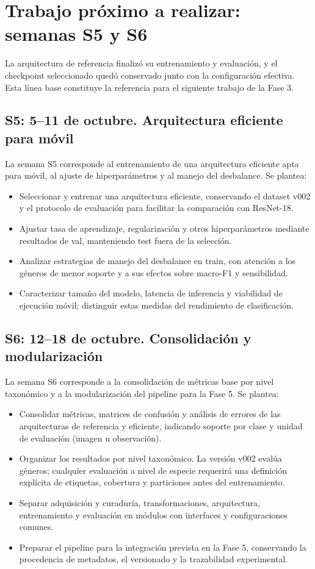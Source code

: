 \documentclass[11pt,a4paper]{article}
\begin{document}
\section{Trabajo próximo a realizar: semanas S5 y S6}

La arquitectura de referencia finalizó su entrenamiento y evaluación, y el
checkpoint seleccionado quedó conservado junto con la configuración efectiva.
Esta línea base constituye la referencia para el siguiente trabajo de la Fase 3.

\subsection{S5: 5--11 de octubre. Arquitectura eficiente para móvil}

La semana S5 corresponde al entrenamiento de una arquitectura eficiente apta
para móvil, al ajuste de hiperparámetros y al manejo del desbalance.
Se plantea:
\begin{itemize}
\item Seleccionar y entrenar una arquitectura eficiente, conservando el dataset
v002 y el protocolo de evaluación para facilitar la comparación con ResNet-18.
\item Ajustar tasa de aprendizaje, regularización y otros hiperparámetros
mediante resultados de val, manteniendo test fuera de la selección.
\item Analizar estrategias de manejo del desbalance en train, con atención a
los géneros de menor soporte y a sus efectos sobre macro-F1 y sensibilidad.
\item Caracterizar tamaño del modelo, latencia de inferencia y viabilidad de
ejecución móvil; distinguir estas medidas del rendimiento de clasificación.
\end{itemize}

\subsection{S6: 12--18 de octubre. Consolidación y modularización}

La semana S6 corresponde a la consolidación de métricas base por nivel
taxonómico y a la modularización del pipeline para la Fase 5.
Se plantea:
\begin{itemize}
\item Consolidar métricas, matrices de confusión y análisis de errores de las
arquitecturas de referencia y eficiente, indicando soporte por clase y unidad
de evaluación (imagen u observación).
\item Organizar los resultados por nivel taxonómico. La versión v002 evalúa
géneros; cualquier evaluación a nivel de especie requerirá una definición
explícita de etiquetas, cobertura y particiones antes del entrenamiento.
\item Separar adquisición y curaduría, transformaciones, arquitectura,
entrenamiento y evaluación en módulos con interfaces y configuraciones comunes.
\item Preparar el pipeline para la integración prevista en la Fase 5,
conservando la procedencia de metadatos, el versionado y la trazabilidad experimental.
\end{itemize}
\end{document}
